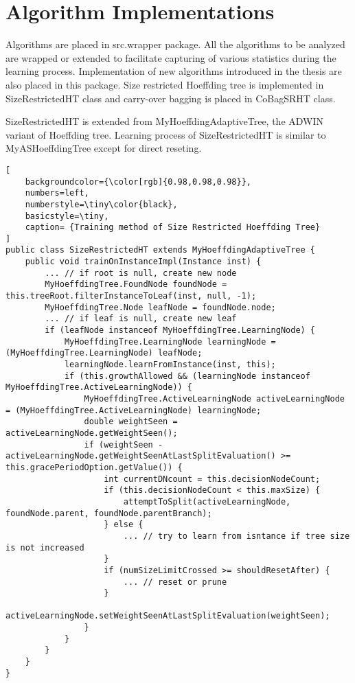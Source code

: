 \section*{Algorithm Implementations}
Algorithms are placed in src.wrapper package. All the algorithms to be analyzed are wrapped or extended to facilitate capturing of various statistics during the learning process. Implementation of new algorithms introduced in the thesis are also placed in this package. Size restricted Hoeffding tree is implemented in SizeRestrictedHT class and carry-over bagging is placed in CoBagSRHT class. 

SizeRestrictedHT is extended from MyHoeffdingAdaptiveTree, the ADWIN variant of Hoeffding tree. Learning process of SizeRestrictedHT is similar to MyASHoeffdingTree except for direct reseting.
\begin{lstlisting}[
    backgroundcolor={\color[rgb]{0.98,0.98,0.98}},
    numbers=left,
    numberstyle=\tiny\color{black},
    basicstyle=\tiny,
    caption= {Training method of Size Restricted Hoeffding Tree}
]
public class SizeRestrictedHT extends MyHoeffdingAdaptiveTree {
    public void trainOnInstanceImpl(Instance inst) {
        ... // if root is null, create new node
        MyHoeffdingTree.FoundNode foundNode = this.treeRoot.filterInstanceToLeaf(inst, null, -1);
        MyHoeffdingTree.Node leafNode = foundNode.node;
        ... // if leaf is null, create new leaf
        if (leafNode instanceof MyHoeffdingTree.LearningNode) {
            MyHoeffdingTree.LearningNode learningNode = (MyHoeffdingTree.LearningNode) leafNode;
            learningNode.learnFromInstance(inst, this);
            if (this.growthAllowed && (learningNode instanceof MyHoeffdingTree.ActiveLearningNode)) {
                MyHoeffdingTree.ActiveLearningNode activeLearningNode = (MyHoeffdingTree.ActiveLearningNode) learningNode;
                double weightSeen = activeLearningNode.getWeightSeen();
                if (weightSeen - activeLearningNode.getWeightSeenAtLastSplitEvaluation() >= this.gracePeriodOption.getValue()) {
                    int currentDNcount = this.decisionNodeCount;
                    if (this.decisionNodeCount < this.maxSize) {
                        attemptToSplit(activeLearningNode, foundNode.parent, foundNode.parentBranch);
                    } else {
                        ... // try to learn from isntance if tree size is not increased
                    }
                    if (numSizeLimitCrossed >= shouldResetAfter) {
                        ... // reset or prune
                    }
                    activeLearningNode.setWeightSeenAtLastSplitEvaluation(weightSeen);
                }
            }
        }
    }
}
\end{lstlisting}
